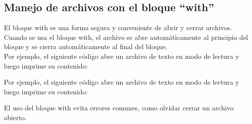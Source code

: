\subsection{Manejo de archivos con el bloque ``with''}
El bloque with es una forma segura y conveniente de abrir y cerrar archivos. Cuando se usa el bloque with, el archivo se abre automáticamente al principio del bloque y se cierra automáticamente al final del bloque.\\

Por ejemplo, el siguiente código abre un archivo de texto en modo de lectura y luego imprime su contenido:

Por ejemplo, el siguiente código abre un archivo de texto en modo de lectura y luego imprime su contenido:

El uso del bloque with evita errores comunes, como olvidar cerrar un archivo abierto.

